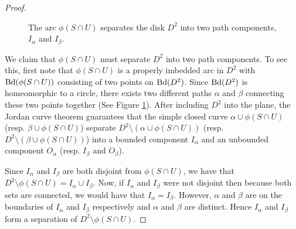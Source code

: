 \begin{proof}
\begin{figure}[h!]
    \caption{The arc \(\phi(S \cap U)\) separates the disk \(D^2\) into two path components, \(I_\alpha\) and \(I_\beta\).}
    \label{fig:thm:book_1_1}
\end{figure}

We claim that \(\phi(S \cap U)\) must separate \(D^2\) into two path components.
To see this, first note that \(\phi(S\cap U)\) is a properly imbedded arc in \(D^2\) with \(\mathrm{Bd}(\phi(S \cap U))\) consisting of two
points on \(\mathrm{Bd}(D^2)\).
Since \(\mathrm{Bd}(D^2)\) is homeomorphic to a circle, there exists two different paths \(\alpha\) and \(\beta\) 
connecting these two points together (See Figure \ref{fig:thm:book_1_1}).
After including \(D^2\) into the plane, the Jordan curve theorem guarantees that the simple closed curve \(\alpha \cup \phi(S\cap U)\) (resp. \(\beta \cup \phi(S \cap U)\))
separate \(D^2 \setminus (\alpha \cup \phi(S\cap U))\) (resp. \(D^2 \setminus (\beta \cup \phi(S\cap U))\)) into a bounded component
\(I_{\alpha}\) and an unbounded component \(O_{\alpha}\) (resp. \(I_{\beta}\) and \(O_{\beta}\)).

Since \(I_{\alpha}\) and \(I_{\beta}\) are both disjoint from \(\phi(S \cap U)\), we have that \(D^2 \setminus \phi(S \cap U) = I_{\alpha} \cup I_{\beta}\).
Now, if \(I_{\alpha}\) and \(I_{\beta}\) were not disjoint then because both sets are connected, we would have that \(I_{\alpha} = I_{\beta}\).
However, \(\alpha\) and \(\beta\) are on the boundaries of \(I_{\alpha}\) and \(I_{\beta}\) respectively and 
\(\alpha\) and \(\beta\) are distinct. 
Hence \(I_{\alpha}\) and \(I_{\beta}\) form a separation of \(D^2 \setminus \phi(S \cap U)\).
\end{proof}






